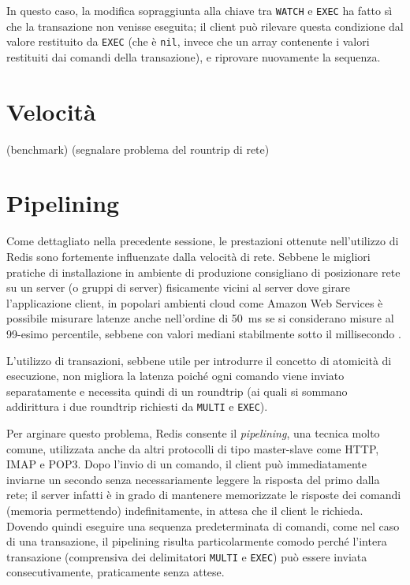 In questo caso, la modifica sopraggiunta alla chiave tra \verb|WATCH| e \verb|EXEC| ha fatto sì
che la transazione non venisse eseguita; il client può rilevare questa condizione dal valore 
restituito da \verb|EXEC| (che è \verb|nil|, invece che un array contenente i valori restituiti
dai comandi della transazione), e riprovare nuovamente la sequenza.

\section{Velocit\`a}

(benchmark)
(segnalare problema del rountrip di rete)


\section{Pipelining}

Come dettagliato nella precedente sessione, le prestazioni ottenute nell'utilizzo di Redis sono
fortemente influenzate dalla velocità di rete. Sebbene le migliori pratiche di installazione in
ambiente di produzione consigliano di posizionare rete su un server (o gruppi di server) fisicamente
vicini al server dove girare l'applicazione client, in popolari ambienti cloud come Amazon Web
Services è possibile misurare latenze anche nell'ordine di \SI{50}{\milli\second} se si considerano
misure al 99-esimo percentile, sebbene con valori mediani stabilmente sotto il millisecondo
\cite{aws-latency}.

L'utilizzo di transazioni, sebbene utile per introdurre il concetto di atomicità di esecuzione,
non migliora la latenza poiché ogni comando viene inviato separatamente e necessita quindi di un 
roundtrip (ai quali si sommano addirittura i due roundtrip richiesti da \verb|MULTI| e \verb|EXEC|).

Per arginare questo problema, Redis consente il \emph{pipelining}, una tecnica molto comune, 
utilizzata anche da altri protocolli di tipo master-slave come HTTP, IMAP e POP3. Dopo l'invio 
di un comando, il client può immediatamente inviarne un secondo senza necessariamente leggere
la risposta del primo dalla rete; il server infatti è in grado di mantenere memorizzate le risposte
dei comandi (memoria permettendo) indefinitamente, in attesa che il client le richieda. Dovendo
quindi eseguire una sequenza predeterminata di comandi, come nel caso di una transazione, il
pipelining risulta particolarmente comodo perché l'intera transazione (comprensiva dei delimitatori
\verb|MULTI| e \verb|EXEC|) può essere inviata consecutivamente, praticamente senza attese.

